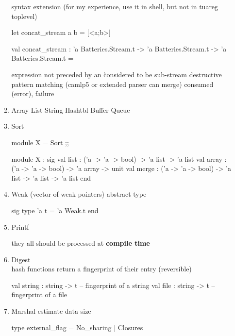 \begin{enumerate}
\begin{enumerate}
      syntax extension (for my experience, use it in shell, but not in
      tuareg toplevel)
\begin{redcode}
  let concat_stream a b = [<a;b>]
\end{redcode}
\begin{bluecode}
val concat_stream :
  'a Batteries.Stream.t -> 'a Batteries.Stream.t -> 'a Batteries.Stream.t =
\end{bluecode}
   expression not preceded by an \` considered to be sub-stream
   destructive pattern matching (camlp5 or extended parser can merge)
   consumed (error), failure
    \item Array List String Hashtbl Buffer Queue
    \item Sort

\begin{redcode}
module X = Sort ;;
\end{redcode}

\begin{bluecode}
module X :
  sig
    val list : ('a -> 'a -> bool) -> 'a list -> 'a list
    val array : ('a -> 'a -> bool) -> 'a array -> unit
    val merge : ('a -> 'a -> bool) -> 'a list -> 'a list -> 'a list
  end
\end{bluecode}

    \item Weak (vector of weak pointers) abstract type

\begin{bluecode}
sig
  type 'a t = 'a Weak.t
end 
\end{bluecode}


    \item Printf

\begin{bluecode}
\end{bluecode}
they all should be processed at \textbf{compile time}


    \item Digest \\
      hash functions return a fingerprint of their entry (reversible) 

\begin{bluecode}
   val string : string -> t -- fingerprint of a string
   val file : string -> t -- fingerprint of a file 
\end{bluecode}

    \item Marshal estimate data size

\begin{alternate}
type external_flag = No_sharing | Closures


\end{alternate}
\end{enumerate}
\end{enumerate}
